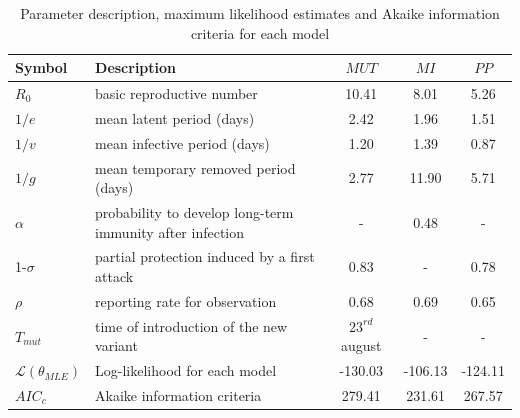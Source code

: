\begin{center}
\begin{table}[htdp]
  \begin{footnotesize}
    \begin{tabular}{|l|l|c|c|c|}
      \hline
      Symbol & Description & $MUT$ & $MI$ & $PP$\\ \hline
      $R_{0}$ & basic reproductive number & 10.41 & 8.01 & 5.26 \\ \hline 
      $1/e$ & mean latent period (days) & 2.42 & 1.96 & 1.51 \\ \hline
      $1/v$ & mean infective period (days) & 1.20 & 1.39 & 0.87\\ \hline
      $1/g$ & mean temporary removed period (days) & 2.77 & 11.90 & 5.71\\ \hline
      $\alpha$ & probability to develop long-term immunity after infection & - & 0.48 &- \\ \hline
      1-$\sigma$ & partial protection induced by a first attack &0.83 &- & 0.78 \\ \hline
      $\rho$ & reporting rate for observation & 0.68 & 0.69 & 0.65 \\ \hline
      $T_{mut}$ & time of introduction of the new variant & $23^{rd}$ august &-&-\\ \hline
      $\mathcal{L}(\theta_{MLE})$ & Log-likelihood for each model &-130.03 & -106.13 & -124.11 \\ \hline
      $AIC_{c}$ & Akaike information criteria &279.41 & 231.61 & 267.57\\ \hline
    \end{tabular}
  \end{footnotesize}
\caption{Parameter description, maximum likelihood estimates and Akaike information criteria for each model}
\label{tab1}
\end{table}%
\end{center}

